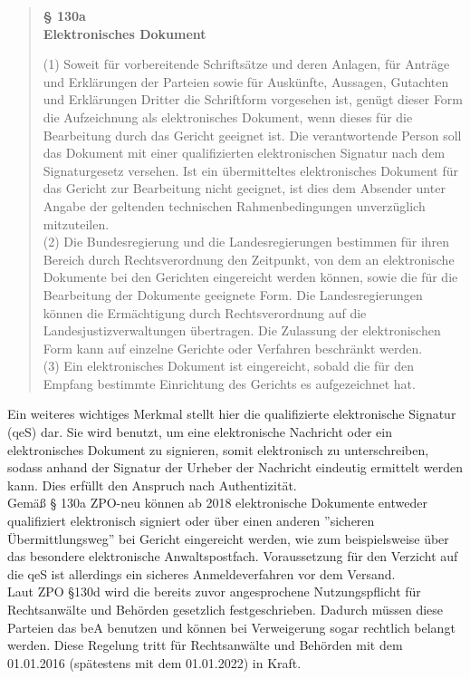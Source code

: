\begin{quote}
	\begin{center}
		\textbf{§ 130a} \\
		\textbf{Elektronisches Dokument}
	\end{center}
	(1) Soweit für vorbereitende Schriftsätze und deren Anlagen, für Anträge und Erklärungen der Parteien sowie für Auskünfte, Aussagen, Gutachten und Erklärungen Dritter die Schriftform vorgesehen ist, genügt dieser Form die Aufzeichnung als elektronisches Dokument, wenn dieses für die Bearbeitung durch das Gericht geeignet ist. Die verantwortende Person soll das Dokument mit einer qualifizierten elektronischen Signatur nach dem Signaturgesetz versehen. Ist ein übermitteltes elektronisches Dokument für das Gericht zur Bearbeitung nicht geeignet, ist dies dem Absender unter Angabe der geltenden technischen Rahmenbedingungen unverzüglich mitzuteilen. \\
	(2) Die Bundesregierung und die Landesregierungen bestimmen für ihren Bereich durch Rechtsverordnung den Zeitpunkt, von dem an elektronische Dokumente bei den Gerichten eingereicht werden können, sowie die für die Bearbeitung der Dokumente geeignete Form. Die Landesregierungen können die Ermächtigung durch Rechtsverordnung auf die Landesjustizverwaltungen übertragen. Die Zulassung der elektronischen Form kann auf einzelne Gerichte oder Verfahren beschränkt werden. \\
	(3) Ein elektronisches Dokument ist eingereicht, sobald die für den Empfang bestimmte Einrichtung des Gerichts es aufgezeichnet hat.
\end{quote}

Ein weiteres wichtiges Merkmal stellt hier die qualifizierte elektronische Signatur (qeS) dar. Sie wird benutzt, um eine elektronische Nachricht oder ein elektronisches Dokument zu signieren, somit elektronisch zu unterschreiben, sodass anhand der Signatur der Urheber der Nachricht eindeutig ermittelt werden kann. Dies erfüllt den Anspruch nach Authentizität. \\
Gemäß § 130a ZPO-neu können ab 2018 elektronische Dokumente entweder qualifiziert elektronisch signiert oder über einen anderen ''sicheren Übermittlungsweg'' bei Gericht eingereicht werden, wie zum beispielsweise über das besondere elektronische Anwaltspostfach. Voraussetzung für den Verzicht auf die qeS ist allerdings ein sicheres Anmeldeverfahren vor dem Versand.
\\
Laut ZPO §130d wird die bereits zuvor angesprochene Nutzungspflicht für Rechtsanwälte und Behörden gesetzlich festgeschrieben. Dadurch müssen diese Parteien das beA benutzen und können bei Verweigerung sogar rechtlich belangt werden. Diese Regelung tritt für Rechtsanwälte und Behörden mit dem 01.01.2016 (spätestens mit dem 01.01.2022) in Kraft.

